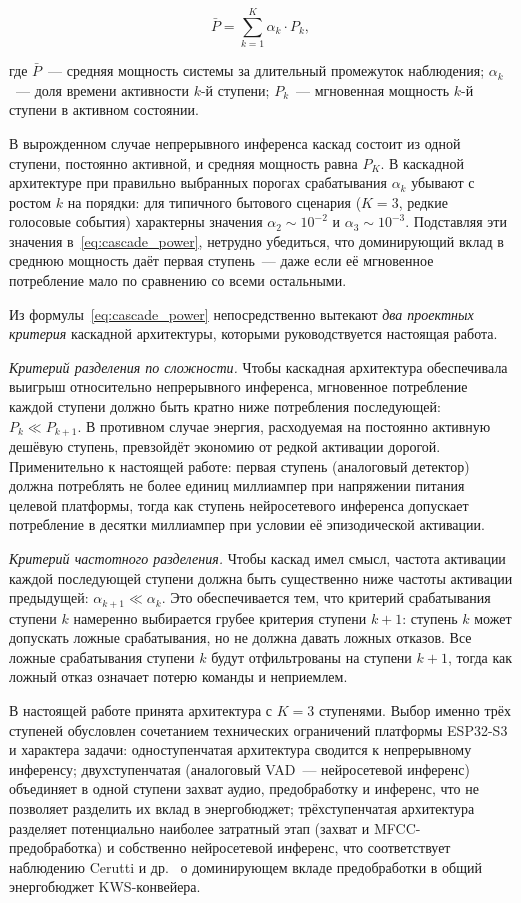 \begin{equation}
	\bar{P} = \sum_{k=1}^{K} \alpha_k \cdot P_k,
	\label{eq:cascade_power}
\end{equation}

где $\bar{P}$~--- средняя мощность системы за длительный промежуток
наблюдения; $\alpha_k$~--- доля времени активности $k$-й ступени;
$P_k$~--- мгновенная мощность $k$-й ступени в активном состоянии.

В вырожденном случае непрерывного инференса каскад состоит из одной
ступени, постоянно активной, и средняя мощность равна $P_K$. В
каскадной архитектуре при правильно выбранных порогах срабатывания
$\alpha_k$ убывают с ростом $k$ на порядки: для типичного бытового
сценария ($K = 3$, редкие голосовые события) характерны значения
$\alpha_2 \sim 10^{-2}$ и $\alpha_3 \sim 10^{-3}$. Подставляя эти
значения в~\eqref{eq:cascade_power}, нетрудно убедиться, что доминирующий
вклад в среднюю мощность даёт первая ступень~--- даже если её мгновенное
потребление мало по сравнению со всеми остальными.

Из формулы~\eqref{eq:cascade_power} непосредственно вытекают \textit{два
	проектных критерия} каскадной архитектуры, которыми руководствуется
настоящая работа.

\textit{Критерий разделения по сложности.} Чтобы каскадная архитектура
обеспечивала выигрыш относительно непрерывного инференса, мгновенное
потребление каждой ступени должно быть кратно ниже потребления
последующей: $P_k \ll P_{k+1}$. В противном случае энергия, расходуемая
на постоянно активную дешёвую ступень, превзойдёт экономию от редкой
активации дорогой. Применительно к настоящей работе: первая ступень
(аналоговый детектор) должна потреблять не более единиц миллиампер при
напряжении питания целевой платформы, тогда как ступень нейросетевого
инференса допускает потребление в десятки миллиампер при условии её
эпизодической активации.

\textit{Критерий частотного разделения.} Чтобы каскад имел смысл, частота
активации каждой последующей ступени должна быть существенно ниже
частоты активации предыдущей: $\alpha_{k+1} \ll \alpha_k$. Это
обеспечивается тем, что критерий срабатывания ступени $k$ намеренно
выбирается грубее критерия ступени $k+1$: ступень $k$ может допускать
ложные срабатывания, но не должна давать ложных отказов. Все ложные
срабатывания ступени $k$ будут отфильтрованы на ступени $k+1$, тогда как
ложный отказ означает потерю команды и неприемлем.

В настоящей работе принята архитектура с $K = 3$ ступенями. Выбор
именно трёх ступеней обусловлен сочетанием технических ограничений
платформы ESP32-S3 и характера задачи: одноступенчатая архитектура
сводится к непрерывному инференсу; двухступенчатая (аналоговый VAD~---
нейросетевой инференс) объединяет в одной ступени захват аудио,
предобработку и инференс, что не позволяет разделить их вклад в
энергобюджет; трёхступенчатая архитектура разделяет потенциально
наиболее затратный этап (захват и MFCC-предобработка) и собственно
нейросетевой инференс, что соответствует наблюдению Cerutti и
др.~\cite{src:7} о доминирующем вкладе предобработки в общий энергобюджет
KWS-конвейера.

